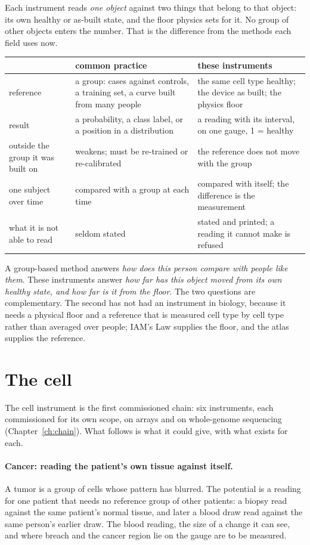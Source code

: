 Each instrument reads \emph{one object} against two things that belong to that object: its own healthy or as-built state, and the floor
physics sets for it. No group of other objects enters the number. That is the difference from the methods each field uses now.
\begin{center}\small
\begin{tabular}{@{}p{}p{}p{}@{}}\toprule
 & common practice & these instruments \\\midrule
reference & a group: cases against controls, a training set, a curve built from many people & the same cell type healthy; the device as built; the physics floor \\
result & a probability, a class label, or a position in a distribution & a reading with its interval, on one gauge, 1 = healthy \\
outside the group it was built on & weakens; must be re-trained or re-calibrated & the reference does not move with the group \\
one subject over time & compared with a group at each time & compared with itself; the difference is the measurement \\
what it is not able to read & seldom stated & stated and printed; a reading it cannot make is refused \\\bottomrule
\end{tabular}
\end{center}
A group-based method answers \emph{how does this person compare with people like them}. These instruments answer \emph{how far has this
object moved from its own healthy state, and how far is it from the floor}. The two questions are complementary. The second has not had an
instrument in biology, because it needs a physical floor and a reference that is measured cell type by cell type rather than averaged over
people; IAM's Law supplies the floor, and the atlas supplies the reference.

\section{The cell}
The cell instrument is the first commissioned chain: six instruments, each commissioned for its own scope, on arrays and on whole-genome sequencing (Chapter~\ref{ch:chain}). What follows is what it could give, with what exists for each.

\paragraph{Cancer: reading the patient's own tissue against itself.} A tumor is a group of cells whose pattern has blurred. The potential is a reading for one patient that needs no reference group of
other patients: a biopsy read against the same patient's normal tissue, and later a blood draw read against the same person's earlier draw.
The blood reading, the size of a change it can see, and where breach and the cancer region lie on the gauge are to be measured. \openprob


